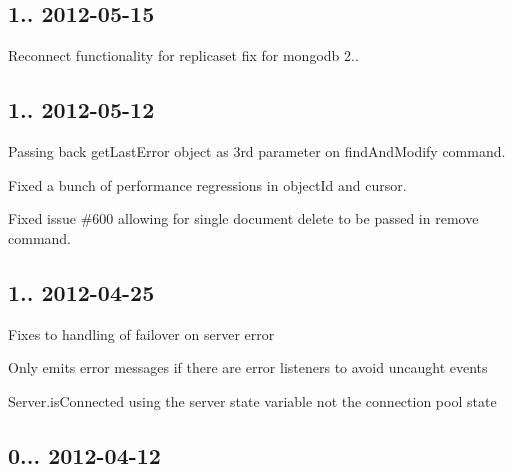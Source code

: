 \subsection*{1.. 2012-\/05-\/15 }


\begin{DoxyItemize}
\item Reconnect functionality for replicaset fix for mongodb 2..
\end{DoxyItemize}

\subsection*{1.. 2012-\/05-\/12 }


\begin{DoxyItemize}
\item Passing back get\+Last\+Error object as 3rd parameter on find\+And\+Modify command.
\item Fixed a bunch of performance regressions in object\+Id and cursor.
\item Fixed issue \#600 allowing for single document delete to be passed in remove command.
\end{DoxyItemize}

\subsection*{1.. 2012-\/04-\/25 }


\begin{DoxyItemize}
\item Fixes to handling of failover on server error
\item Only emits error messages if there are error listeners to avoid uncaught events
\item Server.\+is\+Connected using the server state variable not the connection pool state
\end{DoxyItemize}

\subsection*{0... 2012-\/04-\/12 }


